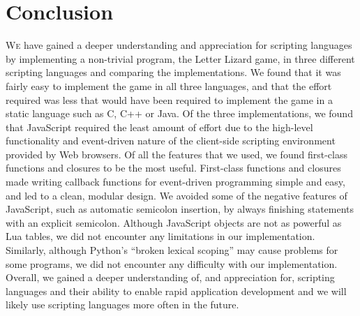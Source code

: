 \section{Conclusion}
\label{conclusion}

\lettrine[nindent=0em,lines=3]{W}{e} have gained a deeper understanding and
appreciation for scripting languages by implementing a non-trivial program,
the Letter Lizard game, in three different scripting languages and comparing the
implementations. We found that it was fairly easy to implement the game in
all three languages, and that the effort required was less that would have been
required to implement the game in a static language such as C, C++ or Java.
Of the three implementations, we found that JavaScript required the least
amount of effort due to the high-level functionality and event-driven nature 
of the client-side scripting environment provided by Web browsers. Of all the features
that we used, we found first-class functions and closures to be the most useful. 
First-class functions and closures made writing callback functions for event-driven
programming simple and easy, and led to a clean, modular design. We avoided some of
the negative features of JavaScript, such as automatic semicolon insertion, by
always finishing statements with an explicit semicolon. Although JavaScript objects
are not as powerful as Lua tables, we did not encounter any limitations in our
implementation. Similarly, although Python's ``broken lexical scoping'' may cause
problems for some programs, we did not encounter any difficulty with our implementation.
Overall, we gained a deeper understanding of, and appreciation for, scripting languages
and their ability to enable rapid application development and we will likely use
scripting languages more often in the future.